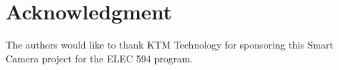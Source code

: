 \documentclass[journal,transmag]{IEEEtran}
\begin{document}
\ifCLASSOPTIONcaptionsoff
  \newpage
\fi





%
%
%
\clearpage

\section*{Acknowledgment}
The authors would like to thank KTM Technology for sponsoring this Smart Camera project for the ELEC 594 program.
\end{document}
